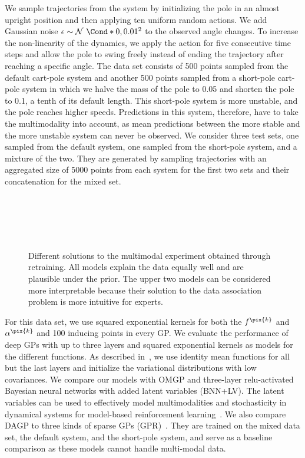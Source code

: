 We sample trajectories from the system by initializing the pole in an almost upright position and then applying ten uniform random actions.
We add Gaussian noise $\epsilon \sim \Gaussian*{0, 0.01^2}$ to the observed angle changes.
To increase the non-linearity of the dynamics, we apply the action for five consecutive time steps and allow the pole to swing freely instead of ending the trajectory after reaching a specific angle.
The data set consists of 500 points sampled from the default cart-pole system and another 500 points sampled from a short-pole cart-pole system in which we halve the mass of the pole to 0.05 and shorten the pole to 0.1, a tenth of its default length.
This short-pole system is more unstable, and the pole reaches higher speeds.
Predictions in this system, therefore, have to take the multimodality into account, as mean predictions between the more stable and the more unstable system can never be observed.
We consider three test sets, one sampled from the default system, one sampled from the short-pole system, and a mixture of the two.
They are generated by sampling trajectories with an aggregated size of 5000 points from each system for the first two sets and their concatenation for the mixed set.
%
\begin{figure}[tp]
    \centering
    \\%
    \\%
    \\%
    \\%
    \caption[Symmetries in DAGP models]{
        \label{fig:data_association:semi_bimodal_multiple}
        Different solutions to the multimodal experiment obtained through retraining.
        All models explain the data equally well and are plausible under the prior.
        The upper two models can be considered more interpretable because their solution to the data association problem is more intuitive for experts.
    }
\end{figure}
%

For this data set, we use squared exponential kernels for both the $f^{\pix{k}}$ and $\alpha^{\pix{k}}$ and 100 inducing points in every GP.
We evaluate the performance of deep GPs with up to three layers and squared exponential kernels as models for the different functions.
As described in~\parencite{salimbeni_doubly_2017,kaiser_bayesian_2018}, we use identity mean functions for all but the last layers and initialize the variational distributions with low covariances.
We compare our models with OMGP and three-layer relu-activated Bayesian neural networks with added latent variables (BNN+LV).
The latent variables can be used to effectively model multimodalities and stochasticity in dynamical systems for model-based reinforcement learning~\parencite{depeweg_decomposition_2018}.
We also compare DAGP to three kinds of sparse GPs (GPR)~\parencite{hensman_scalable_2015}.
They are trained on the mixed data set, the default system, and the short-pole system, and serve as a baseline comparison as these models cannot handle multi-modal data.

